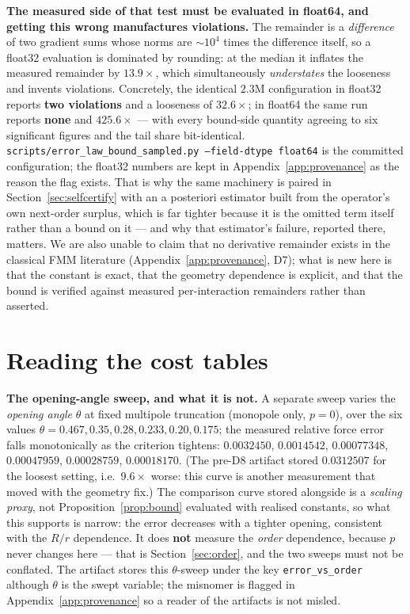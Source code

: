 \noindent\textbf{The measured side of that test must be evaluated in float64, and getting this wrong
manufactures violations.} The remainder is a \emph{difference} of two gradient sums whose norms are
$\sim10^{4}$ times the difference itself, so a float32 evaluation is dominated by rounding: at the
median it inflates the measured remainder by $13.9\times$, which simultaneously \emph{understates}
the looseness and invents violations. Concretely, the identical $2.3$M configuration in float32
reports \textbf{two violations} and a looseness of $32.6\times$; in float64 the same run reports
\textbf{none} and $425.6\times$ --- with every bound-side quantity agreeing to six significant
figures and the tail share bit-identical. \texttt{scripts/\allowbreak error\_\allowbreak law\_\allowbreak bound\_\allowbreak sampled.\allowbreak py
--field-dtype float64} is the committed configuration; the float32 numbers are kept in
Appendix~\ref{app:provenance} as the reason the flag exists. That is
why the same machinery is paired in
Section~\ref{sec:selfcertify} with an a posteriori estimator built from the operator's own
next-order surplus, which is far tighter because it is the omitted term itself rather than a bound on
it --- and why that estimator's failure, reported there, matters. We are also unable to claim that no
derivative remainder exists in the classical FMM literature
(Appendix~\ref{app:provenance}, D7); what is new here is that the constant is exact, that the geometry
dependence is explicit, and that the bound is verified against measured per-interaction remainders
rather than asserted.

\section{Reading the cost tables}\label{app:scaling}
\noindent\textbf{The opening-angle sweep, and what it is not.} A separate sweep varies the
\emph{opening angle} $\theta$ at fixed multipole truncation (monopole only, $p=0$), over the six
values $\theta=0.467,0.35,0.28,0.233,0.20,0.175$; the measured relative force error falls
monotonically as the criterion tightens: $0.0032450$, $0.0014542$, $0.00077348$, $0.00047959$,
$0.00028759$, $0.00018170$. (The pre-D8 artifact stored $0.0312507$ for the loosest setting, i.e.\
$9.6\times$ worse: this curve is another measurement that moved with the geometry fix.) The
comparison curve stored alongside is a \emph{scaling proxy}, not Proposition~\ref{prop:bound}
evaluated with realised constants, so what this supports is narrow: the error decreases with a
tighter opening, consistent with the $R/r$ dependence. It does \textbf{not} measure the \emph{order}
dependence, because $p$ never changes here --- that is Section~\ref{sec:order}, and the two sweeps
must not be conflated. The artifact stores this $\theta$-sweep under the key \texttt{error\_vs\_order}
although $\theta$ is the swept variable; the misnomer is flagged in Appendix~\ref{app:provenance} so a
reader of the artifacts is not misled.

